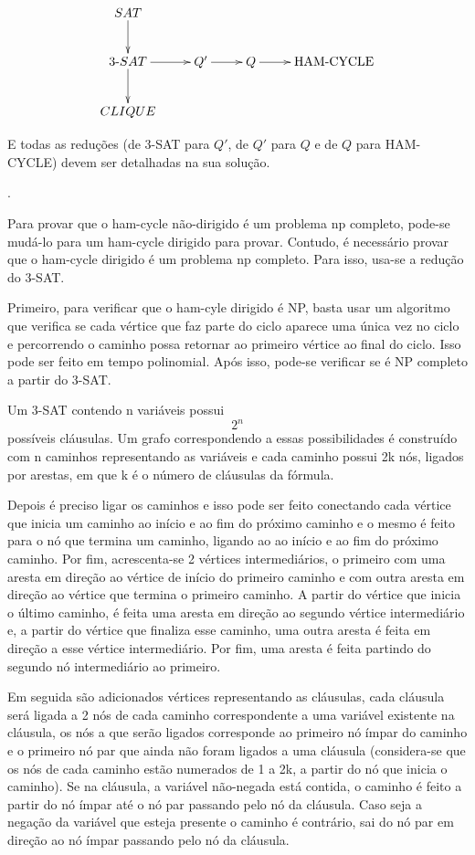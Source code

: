 \documentclass[12pt]{article}
\newcommand{\resposta}[1]{ \noindent {\bf Solução}.{\color{blue} #1}}
\begin{document}
\begin{enumerate}
$$\xymatrix{
  SAT \ar[d] & & & \\
  3\mbox{-}SAT \ar[d]\ar[r] & Q' \ar[r] & Q \ar[r] & \mbox{HAM-CYCLE}  \\
  CLIQUE & & & 
}$$

E todas as reduções (de 3-SAT para $Q'$, de $Q'$ para $Q$ e de $Q$ para HAM-CYCLE) devem ser detalhadas na sua solução.

\resposta{
    Para provar que o ham-cycle não-dirigido é um problema np completo, pode-se mudá-lo para um ham-cycle dirigido para provar. Contudo, é necessário provar que o ham-cycle dirigido é um problema np completo. Para isso, usa-se a redução do 3-SAT.

Primeiro, para verificar que o ham-cyle dirigido é NP, basta usar um algoritmo que verifica se cada vértice que faz parte do ciclo aparece uma única vez no ciclo e percorrendo o caminho possa retornar ao primeiro vértice ao final do ciclo. Isso pode ser feito em tempo polinomial. Após isso, pode-se verificar se é NP completo a partir do 3-SAT.

Um 3-SAT contendo n variáveis possui $$2^n$$ possíveis cláusulas. Um grafo correspondendo a essas possibilidades é construído com n caminhos representando as variáveis e cada caminho possui 2k nós, ligados por arestas, em que k é o número de cláusulas da fórmula.

Depois é preciso ligar os caminhos e isso pode ser feito conectando cada vértice que inicia um caminho ao início e ao fim do próximo caminho e o mesmo é feito para o nó que termina um caminho, ligando ao ao início e ao fim do próximo caminho. Por fim, acrescenta-se 2 vértices intermediários, o primeiro com uma aresta em direção ao vértice de início do primeiro caminho e com outra aresta em direção ao vértice que termina o primeiro caminho. A partir do vértice que inicia o último caminho, é feita uma aresta em direção ao segundo vértice intermediário e, a partir do vértice que finaliza esse caminho, uma outra aresta é feita em direção a esse vértice intermediário. Por fim, uma aresta é feita partindo do segundo nó intermediário ao primeiro.

Em seguida são adicionados vértices representando as cláusulas, cada cláusula será ligada a 2 nós de cada caminho correspondente a uma variável existente na cláusula, os nós a que serão ligados corresponde ao primeiro nó ímpar do caminho e o primeiro nó par que ainda não foram ligados a uma cláusula (considera-se que os nós de cada caminho estão numerados de 1 a 2k, a partir do nó que inicia o caminho). Se na cláusula, a variável não-negada está contida, o caminho é feito a partir do nó ímpar até o nó par passando pelo nó da cláusula. Caso seja a negação da variável que esteja presente o caminho é contrário, sai do nó par em direção ao nó ímpar passando pelo nó da cláusula.

}
\end{enumerate}
\end{document}
